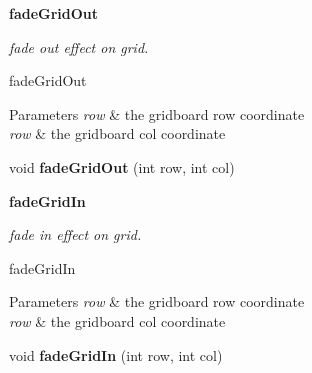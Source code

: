 \begin{Indent}{\bf fade\+Grid\+Out}\par
{\em fade out effect on grid.

fade\+Grid\+Out


\begin{DoxyParams}{Parameters}
{\em row} & the gridboard row coordinate \\
\hline
{\em row} & the gridboard col coordinate \\
\hline
\end{DoxyParams}
}\begin{DoxyCompactItemize}
\item 
\hypertarget{classbattleship_1_1gameboard_1_1Gameboard_adf4f231cd7dc88512b15bcb53b229d9e}{}void {\bfseries fade\+Grid\+Out} (int row, int col)\label{classbattleship_1_1gameboard_1_1Gameboard_adf4f231cd7dc88512b15bcb53b229d9e}

\end{DoxyCompactItemize}
\end{Indent}
\begin{Indent}{\bf fade\+Grid\+In}\par
{\em fade in effect on grid.

fade\+Grid\+In


\begin{DoxyParams}{Parameters}
{\em row} & the gridboard row coordinate \\
\hline
{\em row} & the gridboard col coordinate \\
\hline
\end{DoxyParams}
}\begin{DoxyCompactItemize}
\item 
\hypertarget{classbattleship_1_1gameboard_1_1Gameboard_a1fb2945fc8a0916b5db8294166e90524}{}void {\bfseries fade\+Grid\+In} (int row, int col)\label{classbattleship_1_1gameboard_1_1Gameboard_a1fb2945fc8a0916b5db8294166e90524}

\end{DoxyCompactItemize}
\end{Indent}
